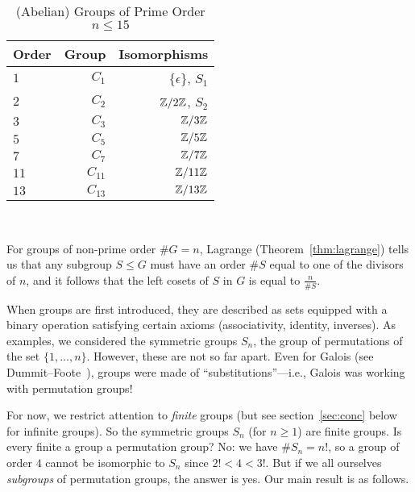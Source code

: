 \begin{center}
  \begin{table}
    \begin{tabular}{ l r r }
      Order & Group & Isomorphisms \\
      \midrule
      $1$ & $C_1$ & $\{ \epsilon \}$, $S_1$ \\
      $2$ & $C_2$ & $\mathbb{Z}/2\mathbb{Z}$, $S_2$ \\
      $3$ & $C_3$ & $\mathbb{Z}/3\mathbb{Z}$ \\
      $5$ & $C_5$ & $\mathbb{Z}/5\mathbb{Z}$ \\
      $7$ & $C_7$ & $\mathbb{Z}/7\mathbb{Z}$ \\
      $11$ & $C_{11}$ & $\mathbb{Z}/11\mathbb{Z}$ \\
      $13$ & $C_{13}$ & $\mathbb{Z}/13\mathbb{Z}$ \\
    \end{tabular}
    \caption{(Abelian) Groups of Prime Order $n \le 15$}~\label{tab:prime-groups}
  \end{table}
\end{center}

\bigskip
For groups of non-prime order $\#G = n$, Lagrange (Theorem~\ref{thm:lagrange}) tells
us that any subgroup $S \le G$ must have an order $\#S$ equal to one of the divisors of $n$,
and it follows that the left cosets of $S$ in $G$ is equal to $\frac{n}{\#S}$.

When groups are first introduced, they are described as sets equipped with a binary operation
satisfying certain axioms (associativity, identity, inverses).
As examples, we considered the symmetric groups $S_n$, the group of permutations of the set
$\{1,\dots,n\}$.  However, these are not so far apart.  Even for Galois (see 
Dummit--Foote~\cite[p.~14 (3)]{DummitFoote}), groups were made of ``substitutions''---i.e., 
Galois was working with permutation groups!  

For now, we restrict attention to \emph{finite} groups (but see section~\ref{sec:conc} below 
for infinite groups).  So the symmetric groups $S_n$ (for $n \geq 1$) are finite groups.  Is 
every finite a group a permutation group?  No: we have $\#S_n=n!$, so a group of order $4$ 
cannot be isomorphic to $S_n$ since $2! < 4 < 3!$.  But if we all ourselves \emph{subgroups} 
of permutation groups, the answer is yes.  Our main result is as follows.
